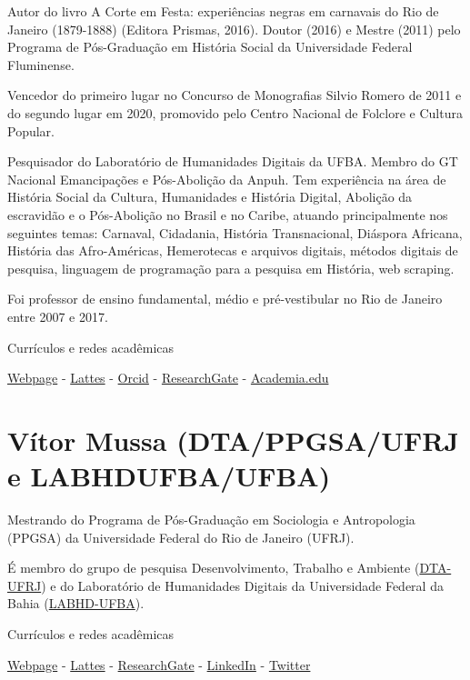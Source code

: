 \documentclass[
]{book}
\begin{document}
Autor do livro A Corte em Festa: experiências negras em carnavais do Rio de Janeiro (1879-1888) (Editora Prismas, 2016).
Doutor (2016) e Mestre (2011) pelo Programa de Pós-Graduação em História Social da Universidade Federal Fluminense.

Vencedor do primeiro lugar no Concurso de Monografias Silvio Romero de 2011 e do segundo lugar em 2020, promovido pelo Centro Nacional de Folclore e Cultura Popular.

Pesquisador do Laboratório de Humanidades Digitais da UFBA. Membro do GT Nacional Emancipações e Pós-Abolição da Anpuh.
Tem experiência na área de História Social da Cultura, Humanidades e História Digital, Abolição da escravidão e o Pós-Abolição no Brasil e no Caribe, atuando principalmente nos seguintes temas: Carnaval, Cidadania, História Transnacional, Diáspora Africana, História das Afro-Américas, Hemerotecas e arquivos digitais, métodos digitais de pesquisa, linguagem de programação para a pesquisa em História, web scraping.

Foi professor de ensino fundamental, médio e pré-vestibular no Rio de Janeiro entre 2007 e 2017.

Currículos e redes acadêmicas

\href{https://ericbrasiln.github.io}{Webpage} - \href{http://lattes.cnpq.br/6853705640900524}{Lattes} - \href{\%22https://orcid.org/0000-0001-5067-8475}{Orcid} - \href{https://www.researchgate.net/profile/Eric_Brasil}{ResearchGate} - \href{https://unilab.academia.edu/EricBrasil}{Academia.edu}

\hypertarget{vuxedtor-mussa-dtappgsaufrj-e-labhdufbaufba}{%
\section{Vítor Mussa (DTA/PPGSA/UFRJ e LABHDUFBA/UFBA)}\label{vuxedtor-mussa-dtappgsaufrj-e-labhdufbaufba}}

Mestrando do Programa de Pós-Graduação em Sociologia e Antropologia (PPGSA) da Universidade Federal do Rio de Janeiro (UFRJ).

É membro do grupo de pesquisa Desenvolvimento, Trabalho e Ambiente (\href{https://www.nucleodta.org/inicio}{DTA-UFRJ}) e do Laboratório de Humanidades Digitais da Universidade Federal da Bahia (\href{http://www.labhd.ufba.br/}{LABHD-UFBA}).

Currículos e redes acadêmicas

\href{https://vmussa.github.io}{Webpage} - \href{http://lattes.cnpq.br/2934187748254130}{Lattes} - \href{https://www.researchgate.net/profile/Vitor-Mussa-2}{ResearchGate} - \href{https://www.linkedin.com/in/vmussa/}{LinkedIn} - \href{https://twitter.com/vitormussa}{Twitter}
\end{document}
